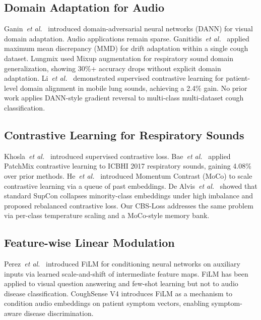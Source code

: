 \documentclass[journal]{IEEEtran}
\begin{document}
\subsection{Domain Adaptation for Audio}

Ganin~\textit{et al.}\ \cite{ganin2016} introduced domain-adversarial
neural networks (DANN) for visual domain adaptation. Audio applications
remain sparse. Ganitidis~\textit{et al.}\ \cite{ganitidis2025} applied
maximum mean discrepancy (MMD) for drift adaptation within a single
cough dataset. Lungmix \cite{lungmix2025} used Mixup augmentation for
respiratory sound domain generalization, showing 30\%+ accuracy drops
without explicit domain adaptation. Li~\textit{et al.}\ \cite{li2025}
demonstrated supervised contrastive learning for patient-level domain
alignment in mobile lung sounds, achieving a 2.4\% gain. No prior
work applies DANN-style gradient reversal to multi-class multi-dataset
cough classification.

\subsection{Contrastive Learning for Respiratory Sounds}

Khosla~\textit{et al.}\ \cite{supcon} introduced supervised contrastive
loss. Bae~\textit{et al.}\ \cite{patchmix} applied PatchMix contrastive
learning to ICBHI 2017 respiratory sounds, gaining 4.08\% over prior
methods. He~\textit{et al.}\ \cite{moco} introduced Momentum Contrast
(MoCo) to scale contrastive learning via a queue of past embeddings.
De Alvis~\textit{et al.}\ \cite{rcl2024} showed that standard SupCon
collapses minority-class embeddings under high imbalance and proposed
rebalanced contrastive loss. Our CBS-Loss addresses the same problem
via per-class temperature scaling and a MoCo-style memory bank.

\subsection{Feature-wise Linear Modulation}

Perez~\textit{et al.}\ \cite{film2018} introduced FiLM for conditioning
neural networks on auxiliary inputs via learned scale-and-shift of
intermediate feature maps. FiLM has been applied to visual question
answering and few-shot learning but not to audio disease classification.
CoughSense V4 introduces FiLM as a mechanism to condition audio
embeddings on patient symptom vectors, enabling symptom-aware
disease discrimination.
\end{document}
